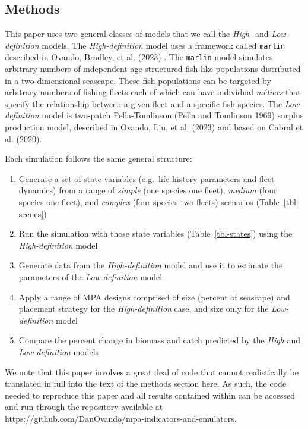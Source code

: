 \documentclass[
  default,
  lineno,
  referee]{sn-jnl}
\providecommand{\tightlist}{%
  \setlength{\itemsep}{0pt}\setlength{\parskip}{0pt}}\usepackage{longtable,booktabs,array}
\begin{document}
\subsection{Methods}\label{methods}

This paper uses two general classes of models that we call the
\emph{High-} and \emph{Low-definition} models. The
\emph{High-definition} model uses a framework called \texttt{marlin}
described in Ovando, Bradley, et al. (2023) . The \texttt{marlin} model
simulates arbitrary numbers of independent age-structured fish-like
populations distributed in a two-dimensional seascape. These fish
populations can be targeted by arbitrary numbers of fishing fleets each
of which can have individual \emph{métiers} that specify the
relationship between a given fleet and a specific fish species. The
\emph{Low-definition} model is two-patch Pella-Tomlinson (Pella and
Tomlinson 1969) surplus production model, described in Ovando, Liu, et
al. (2023) and based on Cabral et al. (2020).

Each simulation follows the same general structure:

\begin{enumerate}
\def\labelenumi{\arabic{enumi}.}
\tightlist
\item
  Generate a set of state variables (e.g.~life history parameters and
  fleet dynamics) from a range of \emph{simple} (one species one fleet),
  \emph{medium} (four species one fleet), and \emph{complex} (four
  species two fleets) scenarios (Table~\ref{tbl-scenes})
\item
  Run the simulation with those state variables (Table~\ref{tbl-states})
  using the \emph{High-definition} model
\item
  Generate data from the \emph{High-definition} model and use it to
  estimate the parameters of the \emph{Low-definition} model
\item
  Apply a range of MPA designs comprised of size (percent of seascape)
  and placement strategy for the \emph{High-definition} case, and size
  only for the \emph{Low-definition} model
\item
  Compare the percent change in biomass and catch predicted by the
  \emph{High} and \emph{Low-definition} models
\end{enumerate}

We note that this paper involves a great deal of code that cannot
realistically be translated in full into the text of the methods section
here. As such, the code needed to reproduce this paper and all results
contained within can be accessed and run through the repository
available at https://github.com/DanOvando/mpa-indicators-and-emulators.
\end{document}
